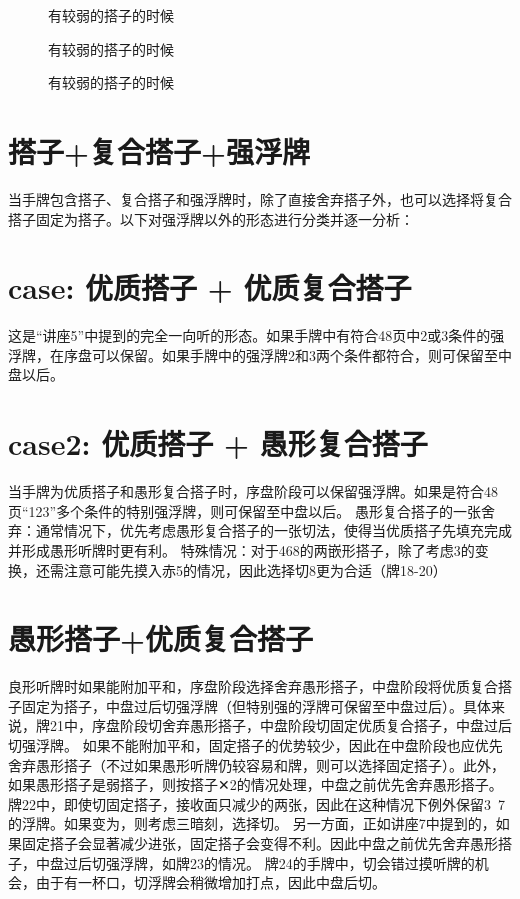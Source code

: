\begin{figure}[h]
    \caption{有较弱的搭子的时候}
    \label{lec8:pai24}
\end{figure}

\begin{figure}[h]
    \caption{有较弱的搭子的时候}
    \label{lec8:pai25}
\end{figure}

\begin{figure}[h]
    \caption{有较弱的搭子的时候}
    \label{lec8:pai26}
\end{figure}

\section{搭子+复合搭子+强浮牌}
当手牌包含搭子、复合搭子和强浮牌时，除了直接舍弃搭子外，也可以选择将复合搭子固定为搭子。以下对强浮牌以外的形态进行分类并逐一分析：
\section{case: 优质搭子 + 优质复合搭子}
这是“讲座5”中提到的完全一向听的形态。如果手牌中有符合48页中2或3条件的强浮牌，在序盘可以保留。如果手牌中的强浮牌2和3两个条件都符合，则可保留至中盘以后。
\section{case2: 优质搭子 + 愚形复合搭子}
当手牌为优质搭子和愚形复合搭子时，序盘阶段可以保留强浮牌。如果是符合48页“123”多个条件的特别强浮牌，则可保留至中盘以后。
愚形复合搭子的一张舍弃：通常情况下，优先考虑愚形复合搭子的一张切法，使得当优质搭子先填充完成并形成愚形听牌时更有利。
特殊情况：对于468的两嵌形搭子，除了考虑3的变换，还需注意可能先摸入赤5的情况，因此选择切8更为合适（牌18-20）

\section{愚形搭子+优质复合搭子}
良形听牌时如果能附加平和，序盘阶段选择舍弃愚形搭子，中盘阶段将优质复合搭子固定为搭子，中盘过后切强浮牌（但特别强的浮牌可保留至中盘过后）。具体来说，牌21中，序盘阶段切舍弃愚形搭子，中盘阶段切固定优质复合搭子，中盘过后切强浮牌。
如果不能附加平和，固定搭子的优势较少，因此在中盘阶段也应优先舍弃愚形搭子（不过如果愚形听牌仍较容易和牌，则可以选择固定搭子）。此外，如果愚形搭子是弱搭子，则按搭子✕2的情况处理，中盘之前优先舍弃愚形搭子。
牌22中，即使切固定搭子，接收面只减少的两张，因此在这种情况下例外保留3~7的浮牌。如果变为，则考虑三暗刻，选择切。
另一方面，正如讲座7中提到的，如果固定搭子会显著减少进张，固定搭子会变得不利。因此中盘之前优先舍弃愚形搭子，中盘过后切强浮牌，如牌23的情况。
牌24的手牌中，切会错过摸听牌的机会，由于有一杯口，切浮牌会稍微增加打点，因此中盘后切。

